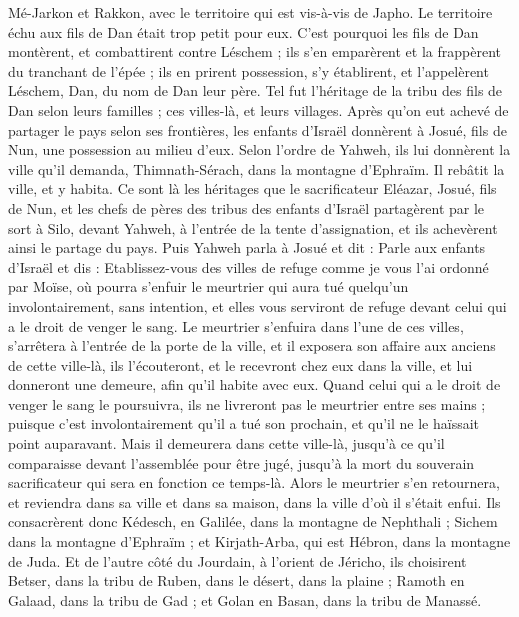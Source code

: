 \begin{multicols}{2}
Mé-Jarkon et Rakkon, avec le territoire qui est vis-à-vis de Japho.
Le territoire échu aux fils de Dan était trop petit pour eux. C’est pourquoi les fils de Dan montèrent, et combattirent contre Léschem ; ils s’en emparèrent et la frappèrent du tranchant de l’épée ; ils en prirent possession, s’y établirent, et l’appelèrent Léschem, Dan, du nom de Dan leur père.
Tel fut l’héritage de la tribu des fils de Dan selon leurs familles ; ces villes-là, et leurs villages.
Après qu’on eut achevé de partager le pays selon ses frontières, les enfants d’Israël donnèrent à Josué, fils de Nun, une possession au milieu d’eux.
Selon l’ordre de Yahweh, ils lui donnèrent la ville qu’il demanda, Thimnath-Sérach, dans la montagne d’Ephraïm. Il rebâtit la ville, et y habita.
Ce sont là les héritages que le sacrificateur Eléazar, Josué, fils de Nun, et les chefs de pères des tribus des enfants d’Israël partagèrent par le sort à Silo, devant Yahweh, à l’entrée de la tente d’assignation, et ils achevèrent ainsi le partage du pays.
\VerseOne{}Puis Yahweh parla à Josué et dit :
Parle aux enfants d’Israël et dis : Etablissez-vous des villes de refuge comme je vous l’ai ordonné par Moïse,
où pourra s’enfuir le meurtrier qui aura tué quelqu’un involontairement, sans intention, et elles vous serviront de refuge devant celui qui a le droit de venger le sang.
Le meurtrier s’enfuira dans l’une de ces villes, s’arrêtera à l’entrée de la porte de la ville, et il exposera son affaire aux anciens de cette ville-là, ils l’écouteront, et le recevront chez eux dans la ville, et lui donneront une demeure, afin qu’il habite avec eux.
Quand celui qui a le droit de venger le sang le poursuivra, ils ne livreront pas le meurtrier entre ses mains ; puisque c’est involontairement qu’il a tué son prochain, et qu’il ne le haïssait point auparavant.
Mais il demeurera dans cette ville-là, jusqu’à ce qu’il comparaisse devant l’assemblée pour être jugé, jusqu’à la mort du souverain sacrificateur qui sera en fonction ce temps-là. Alors le meurtrier s’en retournera, et reviendra dans sa ville et dans sa maison, dans la ville d’où il s’était enfui.
Ils consacrèrent donc Kédesch, en Galilée, dans la montagne de Nephthali ; Sichem dans la montagne d’Ephraïm ; et Kirjath-Arba, qui est Hébron, dans la montagne de Juda.
Et de l’autre côté du Jourdain, à l’orient de Jéricho, ils choisirent Betser, dans la tribu de Ruben, dans le désert, dans la plaine ; Ramoth en Galaad, dans la tribu de Gad ; et Golan en Basan, dans la tribu de Manassé.

\end{multicols}

